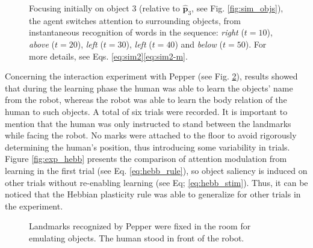 \documentclass[letterpaper, 10 pt, conference]{ieeeconf}  %
\begin{document}
\begin{figure}[h!]
\begin{center}
	\end{center}
	\caption{Focusing initially on object 3 (relative to $\mathbf{\hat{p}}_3$, see Fig. \ref{fig:sim_objs}), the agent switches attention to surrounding objects, from instantaneous recognition of words in the sequence: \textit{right} ($t=10$), \textit{above} ($t=20$), \textit{left} ($t=30$), \textit{left} ($t=40$) and \textit{below} ($t=50$). For more details, see Eqs. \eqref{eq:sim2}\eqref{eq:sim2-m}.}
	\label{fig:sim2-around}
\end{figure}

Concerning the interaction experiment with Pepper (see Fig. \ref{fig:exp_scene}), results showed that during the learning phase the human was able to learn the objects' name from the robot, whereas the robot was able to learn the body relation of the human to such objects. A total of six trials were recorded. It is important to mention that the human was only instructed to stand between the landmarks while facing the robot. No marks were attached to the floor to avoid rigorously determining the human’s position, thus introducing some variability in trials. Figure \ref{fig:exp_hebb} presents the comparison of attention modulation from learning in the first trial (see Eq. \eqref{eq:hebb_rule}), so object saliency is induced on other trials without re-enabling learning (see Eq; \eqref{eq:hebb_stim}). Thus, it can be noticed that the Hebbian plasticity rule was able to generalize for other trials in the experiment.

\begin{figure}[h!]
	\begin{center}
		
	\end{center}
	\caption{Landmarks recognized by Pepper were fixed in the room for emulating objects. The human stood in front of the robot.}
	\label{fig:exp_scene}
\end{figure}
\end{document}

